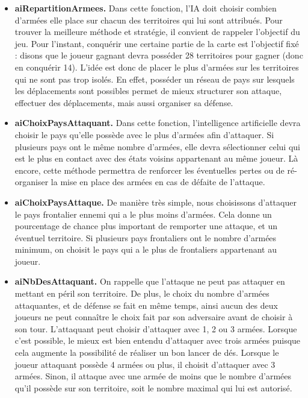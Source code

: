\begin{itemize}
    \item \textbf{aiRepartitionArmees.} 
    Dans cette fonction, l'IA doit choisir combien d'armées elle place sur chacun des territoires qui lui sont attribués. Pour trouver la meilleure méthode et stratégie, il convient de rappeler l'objectif du jeu. Pour l'instant, conquérir une certaine partie de la carte est l'objectif fixé : disons que le joueur gagnant devra posséder 28 territoires pour gagner (donc en conquérir 14). L'idée est donc de placer le plus d'armées sur les territoires qui ne sont pas trop isolés. En effet, posséder un réseau de pays sur lesquels les déplacements sont possibles permet de mieux structurer son attaque, effectuer des déplacements, mais aussi organiser sa défense.
    \newline
    
    \item \textbf{aiChoixPaysAttaquant.}
    Dans cette fonction, l'intelligence artificielle devra choisir le pays qu'elle possède avec le plus d'armées afin d'attaquer. Si plusieurs pays ont le même nombre d'armées, elle devra sélectionner celui qui est le plus en contact avec des états voisins appartenant au même joueur. Là encore, cette méthode permettra de renforcer les éventuelles pertes ou de ré-organiser la mise en place des armées en cas de défaite de l'attaque. 
    \newline
    
    \item \textbf{aiChoixPaysAttaque.}
   De manière très simple, nous choisissons d'attaquer le pays frontalier ennemi qui a le plus moins d'armées. Cela donne un pourcentage de chance plus important de remporter une attaque, et un éventuel territoire. Si plusieurs pays frontaliers ont le nombre d'armées minimum, on choisit le pays qui a le plus de frontaliers appartenant au joueur.
   \newline
   
   \item \textbf{aiNbDesAttaquant.}
    On rappelle que l'attaque ne peut pas attaquer en mettant en péril son territoire. De plus, le choix du nombre d'armées attaquantes, et de défense se fait en même temps, ainsi aucun des deux joueurs ne peut connaître le choix fait par son adversaire avant de choisir à son tour. 
    \newline
    L'attaquant peut choisir d'attaquer avec 1, 2 ou 3 armées. Lorsque c'est possible, le mieux est bien entendu d'attaquer avec trois armées puisque cela augmente la possibilité de réaliser un bon lancer de dés. Lorsque le joueur attaquant possède 4 armées ou plus, il choisit d'attaquer avec 3 armées. Sinon, il attaque avec une armée de moins que le nombre d'armées qu'il possède sur son territoire, soit le nombre maximal qui lui est autorisé.
    \newline
    

\end{itemize}
